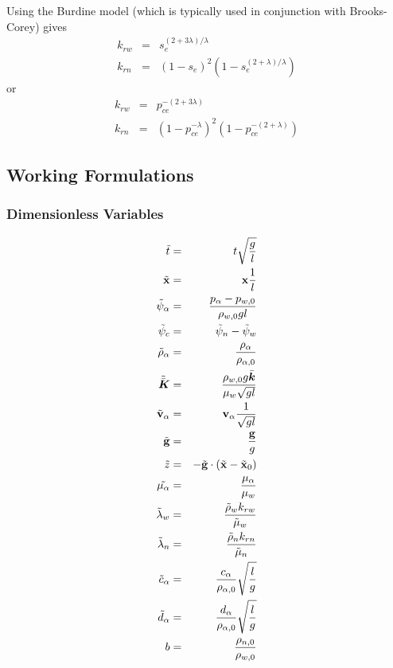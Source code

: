 \documentclass[10pt,dvips,twoside,reqno]{amsart}
\begin{document}
 Using the Burdine model (which is
typically used in conjunction with Brooks-Corey) gives
\begin{eqnarray}
k_{rw} &=& s_e^{(2 + 3 \lambda)/\lambda} \\
k_{rn} &=& (1-s_e)^2(1-s_e^{(2+\lambda)/\lambda}) 
\end{eqnarray}
or
\begin{eqnarray}
k_{rw} &=& p_{ce}^{-(2 + 3 \lambda)} \\
k_{rn} &=& (1-p_{ce}^{-\lambda})^2(1-p_{ce}^{-(2+\lambda)}) 
\end{eqnarray}

\subsection{Working Formulations}

\subsubsection{Dimensionless Variables}
\begin{eqnarray}
\tilde{t} &=& t \sqrt{\frac{g}{l}} \\
\tilde{{\bf x}} &=& {\bf x} \frac{1}{l} \\
\tilde{\psi}_{\alpha} &=& \frac{p_{\alpha} - p_{w,0}}{\rho_{w,0} g l} \label{eq:head2p}\\
\tilde{\psi}_c &=& \tilde{\psi}_n - \tilde{\psi}_w \label{eq:capHead}\\
\tilde{\rho}_{\alpha} &=& \frac{\rho_{\alpha}}{\rho_{\alpha,0}} \\
\tilde{\bar{\mbox{{\boldmath ${K}$}}}} &=& \frac{\rho_{w,0} g \bar{\mbox{{\boldmath ${k}$}}}}{\mu_w \sqrt{gl}} \\
\tilde{{\bf v}}_{\alpha} &=& {\bf v}_{\alpha} \frac{1}{\sqrt{gl}} \\
\tilde{{\bf g}} &=& \frac{{\bf g}}{g} \label{eq:dg2p} \\
\tilde{z} &=& -\tilde{{\bf g}} \cdot (\tilde{{\bf x}} - \tilde{{\bf x}}_0) \\
\tilde{\mu_{\alpha}} &=& \frac{\mu_{\alpha}}{\mu_w}\\
\tilde{\lambda}_w &=& \frac{\tilde{\rho}_w k_{rw}}{\tilde{\mu}_w}\\
\tilde{\lambda}_n &=& \frac{\tilde{\rho}_n k_{rn}}{\tilde{\mu}_n}\\
\tilde{c}_{\alpha} &=& \frac{c_{\alpha}}{\rho_{\alpha,0}}\sqrt{\frac{l}{g}} \\ 
\tilde{d}_{\alpha} &=& \frac{d_{\alpha}}{\rho_{\alpha,0}}\sqrt{\frac{l}{g}} \\
b &=& \frac{\rho_{n,0}}{\rho_{w,0}}
\end{eqnarray}
\end{document}
